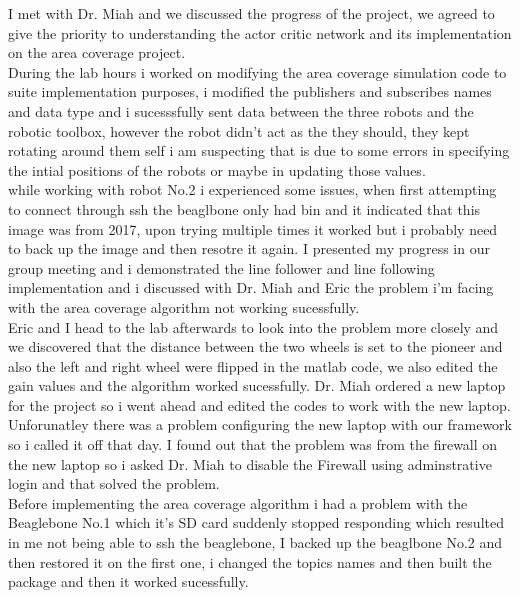 \documentclass[fontsize=11pt, %
                             paper=letter, %
                             twoside, %
                             captions=tableheading,
                             index=totoc,
                             hyperref]{labbook}
\begin{document}
I met with Dr. Miah and we discussed the progress of the project, we agreed to give the priority to understanding the actor critic network and its implementation on the area coverage project. 
\\ During the lab hours i worked on modifying the area coverage simulation code to suite implementation purposes, i modified the publishers and subscribes names and data type and i sucesssfully sent data between the three robots and the robotic toolbox, however the robot didn't act as the they should, they kept rotating around them self i am suspecting that is due to some errors in specifying the intial positions of the robots or maybe in updating those values. 
\\while working with robot No.2 i experienced some issues, when first attempting to connect through ssh the beaglbone only had bin and it indicated that this image was from 2017, upon trying multiple times it worked but i probably need to back up the image and then resotre it again. 
I presented my progress in our group meeting and i demonstrated the line follower and line following implementation and i discussed with Dr. Miah and Eric the problem i'm facing with the area coverage algorithm not working sucessfully. 
\\Eric and I head to the lab afterwards to look into the problem more closely and we discovered that the distance between the two wheels is set to the pioneer and also the left and right wheel were flipped in the matlab code, we also edited the gain values and the algorithm worked sucessfully. 
Dr. Miah ordered a new laptop for the project so i went ahead and edited the codes to work with the new laptop. Unforunatley there was a problem configuring the new laptop with our framework so i called it off that day. 
I found out that the problem was from the firewall on the new laptop so i asked Dr. Miah to disable the Firewall using adminstrative login and that solved the problem.
\\Before implementing the area coverage algorithm i had a problem with the Beaglebone No.1 which it's SD card suddenly stopped responding which resulted in me not being able to ssh the beaglebone, I backed up the beaglbone No.2 and then restored it on the first one, i changed the topics names and then built the package and then it worked sucessfully. 
\end{document}
